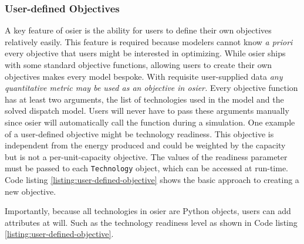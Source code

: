\subsubsection{User-defined Objectives}

A key feature of \ac{osier} is the ability for users to define their own
objectives relatively easily. This feature is required
because modelers cannot know \textit{a priori} every objective that users might
be interested in optimizing. While \ac{osier} ships with some standard objective
functions, allowing users to create their own objectives makes every model
bespoke. With requisite user-supplied data \textit{any quantitative metric may be used as an objective in
\ac{osier}.} Every objective function has at least two arguments, the list of
technologies used in the model and the solved dispatch model. Users will never
have to pass these arguments manually since \ac{osier} will automatically call
the function during a simulation. One example of a user-defined objective might
be technology readiness. This objective is independent from the energy produced
and could be weighted by the capacity but is not a per-unit-capacity objective.
The values of the readiness parameter must be passed to each \texttt{Technology}
object, which can be accessed at run-time. Code listing
\ref{listing:user-defined-objective} shows the basic approach to creating a new
objective. 

\noindent
Importantly, because all technologies in \ac{osier} are Python objects, users
can add attributes at will. Such as the technology readiness level as shown in
Code listing \ref{listing:user-defined-objective}. 

